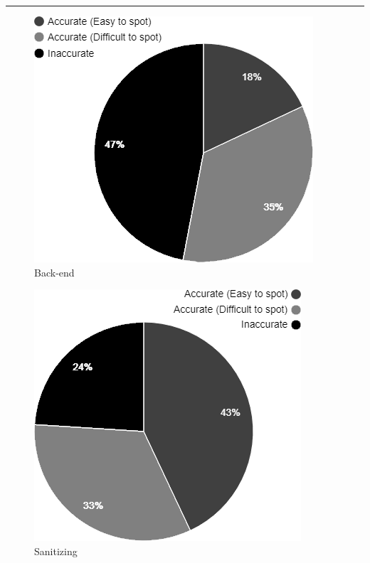 \vspace{0.4cm}
\hrule    
\hspace{-0.6cm}
\begin{minipage}{0.5\textwidth}
\begin{figure}[H]
    \caption{Back-end}
    \includegraphics[scale=0.65]{./Images/web.png}
\end{figure}
\end{minipage}
\hspace{0.8cm}
\begin{minipage}{0.45\textwidth}\raggedleft
\begin{figure}[H]
    \caption{Sanitizing}
    \includegraphics[scale=0.65]{./Images/unsanitized.png}
\end{figure}

\end{minipage}
